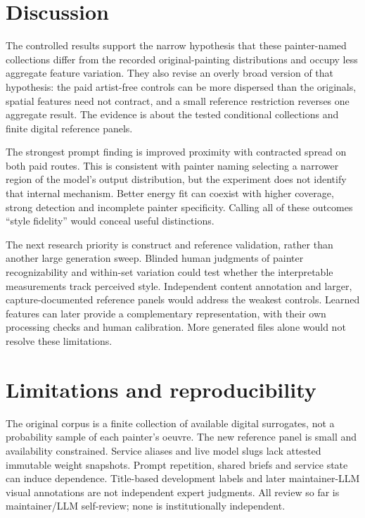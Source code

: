 \documentclass[11pt]{article}
\begin{document}
\section{Discussion}
The controlled results support the narrow hypothesis that these painter-named
collections differ from the recorded original-painting distributions and occupy
less aggregate feature variation. They also revise an overly broad version of
that hypothesis: the paid artist-free controls can be more dispersed than the
originals, spatial features need not contract, and a small reference restriction
reverses one aggregate result. The evidence is about the tested conditional
collections and finite digital reference panels.

The strongest prompt finding is improved proximity with contracted spread on
both paid routes. This is consistent with painter naming selecting a narrower
region of the model's output distribution, but the experiment does not identify
that internal mechanism. Better energy fit can coexist with higher coverage,
strong detection and incomplete painter specificity. Calling all of these outcomes
``style fidelity'' would conceal useful distinctions.

The next research priority is construct and reference validation, rather than
another large generation sweep. Blinded human judgments of painter recognizability
and within-set variation could test whether the interpretable measurements track
perceived style. Independent content annotation and larger, capture-documented
reference panels would address the weakest controls. Learned features can later
provide a complementary representation, with their own processing checks and
human calibration. More generated files alone would not resolve these limitations.

\section{Limitations and reproducibility}
The original corpus is a finite collection of available digital surrogates, not
a probability sample of each painter's oeuvre. The new reference panel is small
and availability constrained. Service aliases and live model slugs lack attested
immutable weight snapshots. Prompt repetition, shared briefs and service state
can induce dependence. Title-based development labels and later maintainer-LLM
visual annotations are not independent expert judgments. All review so far is
maintainer/LLM self-review; none is institutionally independent.
\end{document}
